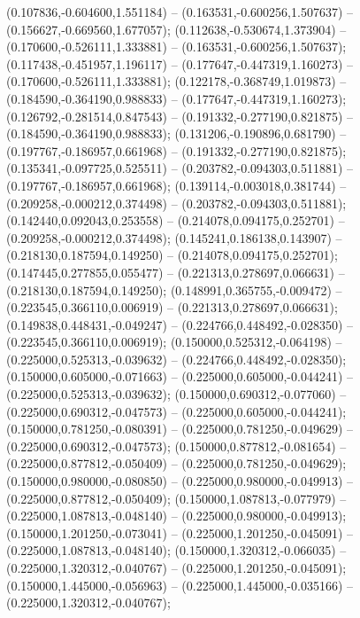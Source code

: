  (0.107836,-0.604600,1.551184) -- (0.163531,-0.600256,1.507637) -- (0.156627,-0.669560,1.677057);
 (0.112638,-0.530674,1.373904) -- (0.170600,-0.526111,1.333881) -- (0.163531,-0.600256,1.507637);
 (0.117438,-0.451957,1.196117) -- (0.177647,-0.447319,1.160273) -- (0.170600,-0.526111,1.333881);
 (0.122178,-0.368749,1.019873) -- (0.184590,-0.364190,0.988833) -- (0.177647,-0.447319,1.160273);
 (0.126792,-0.281514,0.847543) -- (0.191332,-0.277190,0.821875) -- (0.184590,-0.364190,0.988833);
 (0.131206,-0.190896,0.681790) -- (0.197767,-0.186957,0.661968) -- (0.191332,-0.277190,0.821875);
 (0.135341,-0.097725,0.525511) -- (0.203782,-0.094303,0.511881) -- (0.197767,-0.186957,0.661968);
 (0.139114,-0.003018,0.381744) -- (0.209258,-0.000212,0.374498) -- (0.203782,-0.094303,0.511881);
 (0.142440,0.092043,0.253558) -- (0.214078,0.094175,0.252701) -- (0.209258,-0.000212,0.374498);
 (0.145241,0.186138,0.143907) -- (0.218130,0.187594,0.149250) -- (0.214078,0.094175,0.252701);
 (0.147445,0.277855,0.055477) -- (0.221313,0.278697,0.066631) -- (0.218130,0.187594,0.149250);
 (0.148991,0.365755,-0.009472) -- (0.223545,0.366110,0.006919) -- (0.221313,0.278697,0.066631);
 (0.149838,0.448431,-0.049247) -- (0.224766,0.448492,-0.028350) -- (0.223545,0.366110,0.006919);
 (0.150000,0.525312,-0.064198) -- (0.225000,0.525313,-0.039632) -- (0.224766,0.448492,-0.028350);
 (0.150000,0.605000,-0.071663) -- (0.225000,0.605000,-0.044241) -- (0.225000,0.525313,-0.039632);
 (0.150000,0.690312,-0.077060) -- (0.225000,0.690312,-0.047573) -- (0.225000,0.605000,-0.044241);
 (0.150000,0.781250,-0.080391) -- (0.225000,0.781250,-0.049629) -- (0.225000,0.690312,-0.047573);
 (0.150000,0.877812,-0.081654) -- (0.225000,0.877812,-0.050409) -- (0.225000,0.781250,-0.049629);
 (0.150000,0.980000,-0.080850) -- (0.225000,0.980000,-0.049913) -- (0.225000,0.877812,-0.050409);
 (0.150000,1.087813,-0.077979) -- (0.225000,1.087813,-0.048140) -- (0.225000,0.980000,-0.049913);
 (0.150000,1.201250,-0.073041) -- (0.225000,1.201250,-0.045091) -- (0.225000,1.087813,-0.048140);
 (0.150000,1.320312,-0.066035) -- (0.225000,1.320312,-0.040767) -- (0.225000,1.201250,-0.045091);
 (0.150000,1.445000,-0.056963) -- (0.225000,1.445000,-0.035166) -- (0.225000,1.320312,-0.040767);
